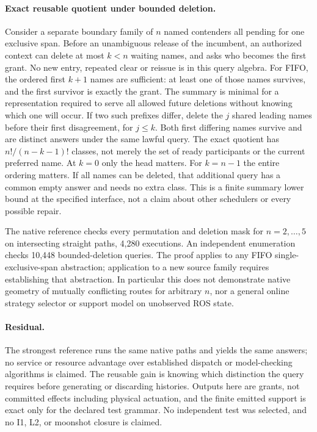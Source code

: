\documentclass{article}
\begin{document}
\paragraph{Exact reusable quotient under bounded deletion.}
Consider a separate boundary family of \(n\) named contenders all
pending for one exclusive span. Before an unambiguous release of the
incumbent, an authorized context can delete at most \(k<n\) waiting
names, and asks who becomes the first grant. No new entry, repeated
clear or reissue is in this query algebra. For FIFO, the ordered first
\(k+1\) names are sufficient: at least one of those names survives, and
the first survivor is exactly the grant. The summary is minimal for a
representation required to serve all allowed future deletions without
knowing which one will occur. If two such prefixes differ, delete the
\(j\) shared leading names before their first disagreement, for
\(j\le k\). Both first differing names survive and are distinct answers
under the same lawful query. The exact quotient has \(n!/(n-k-1)!\)
classes, not merely the set of ready participants or the current
preferred name. At \(k=0\) only the head matters. For \(k=n-1\)
the entire ordering matters. If all names can be deleted, that
additional query has a common empty answer and needs no extra class.
This is a finite summary lower bound at the specified interface, not a
claim about other schedulers or every possible repair.

The native reference checks every permutation and deletion mask for
\(n=2,\ldots,5\) on intersecting straight paths, 4,280 executions.
An independent enumeration checks 10,448 bounded-deletion queries.
The proof applies to any FIFO single-exclusive-span abstraction;
application to a new source family requires establishing that abstraction.
In particular this does not demonstrate native geometry of mutually
conflicting routes for arbitrary \(n\), nor a general online
strategy selector or support model on unobserved ROS state.

\paragraph{Residual.}
The strongest reference runs the same native paths and yields the same
answers; no service or resource advantage over established dispatch
or model-checking algorithms is claimed. The reusable gain is knowing
which distinction the query requires before generating or discarding
histories. Outputs here are grants, not committed effects including
physical actuation, and the finite emitted support is exact only for
the declared test grammar. No independent test was selected, and no
I1, L2, or moonshot closure is claimed.
\end{document}
